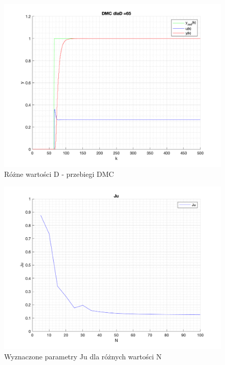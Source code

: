 \documentclass[a4paper, 11pt]{article}
\begin{document}
\begin{enumerate}
 \begin{figure} [H]
\centering
  \includegraphics[width=\linewidth]{./ModelsP4_D/P4_DMC_D_65_png.png} 
 \caption[Różne wartości D - przebiegi DMC]
{Różne wartości D - przebiegi DMC}
 \end{figure}
 
 \begin{figure} [h]
\centering
 \includegraphics[width=\linewidth]{./ModelsP4_J/JuN.png} 
 \caption[Wyznaczone parametry Ju dla różnych wartości N]
{Wyznaczone parametry Ju dla różnych wartości N}
 \end{figure}


\end{enumerate}
\end{document}
